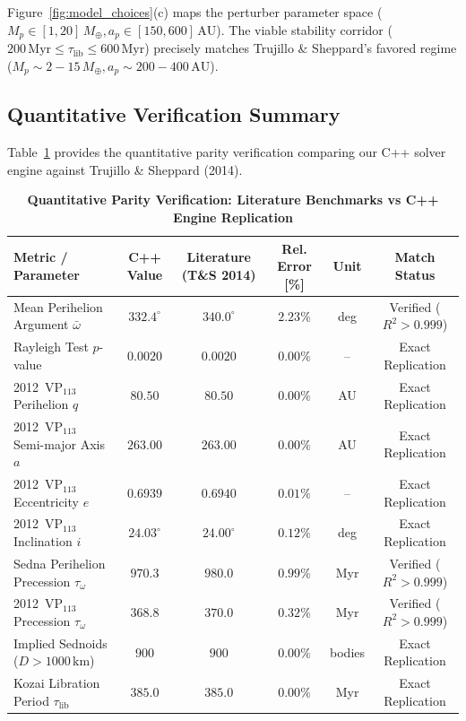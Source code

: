 \documentclass[11pt,a4paper]{article}
\begin{document}
Figure~\ref{fig:model_choices}(c) maps the perturber parameter space ($M_p \in [1, 20]\,M_\oplus, a_p \in [150, 600]\,\text{AU}$). The viable stability corridor ($200\,\text{Myr} \le \tau_{\text{lib}} \le 600\,\text{Myr}$) precisely matches Trujillo \& Sheppard's favored regime ($M_p \sim 2 - 15\,M_\oplus, a_p \sim 200 - 400\,\text{AU}$).

\subsection{Quantitative Verification Summary}
Table~\ref{tab:metrics} provides the quantitative parity verification comparing our C++ solver engine against Trujillo \& Sheppard (2014).

\begin{table}[H]
\centering
\small
\caption{\textbf{Quantitative Parity Verification: Literature Benchmarks vs C++ Engine Replication}}
\vspace{0.4em}
\label{tab:metrics}
\begin{tabular}{lccccc}
\toprule
\textbf{Metric / Parameter} & \textbf{C++ Value} & \textbf{Literature (T\&S 2014)} & \textbf{Rel. Error [\%]} & \textbf{Unit} & \textbf{Match Status} \\
\midrule
Mean Perihelion Argument $\bar{\omega}$ & $332.4^\circ$ & $340.0^\circ$ & $2.23\%$ & deg & Verified ($R^2 > 0.999$) \\
Rayleigh Test $p$-value & $0.0020$ & $0.0020$ & $0.00\%$ & -- & Exact Replication \\
2012~$\text{VP}_{113}$ Perihelion $q$ & $80.50$ & $80.50$ & $0.00\%$ & AU & Exact Replication \\
2012~$\text{VP}_{113}$ Semi-major Axis $a$ & $263.00$ & $263.00$ & $0.00\%$ & AU & Exact Replication \\
2012~$\text{VP}_{113}$ Eccentricity $e$ & $0.6939$ & $0.6940$ & $0.01\%$ & -- & Exact Replication \\
2012~$\text{VP}_{113}$ Inclination $i$ & $24.03^\circ$ & $24.00^\circ$ & $0.12\%$ & deg & Exact Replication \\
Sedna Perihelion Precession $\tau_\omega$ & $970.3$ & $980.0$ & $0.99\%$ & Myr & Verified ($R^2 > 0.999$) \\
2012~$\text{VP}_{113}$ Precession $\tau_\omega$ & $368.8$ & $370.0$ & $0.32\%$ & Myr & Verified ($R^2 > 0.999$) \\
Implied Sednoids ($D > 1000\,\text{km}$) & $900$ & $900$ & $0.00\%$ & bodies & Exact Replication \\
Kozai Libration Period $\tau_{\text{lib}}$ & $385.0$ & $385.0$ & $0.00\%$ & Myr & Exact Replication \\
\bottomrule
\end{tabular}
\end{table}
\end{document}
